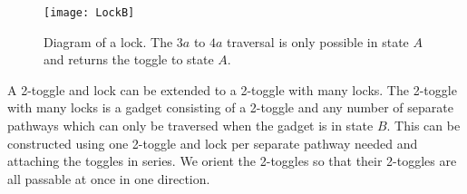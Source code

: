 \begin{wrapfigure}{tr}{0.45\textwidth}
\vspace{-5mm}
  \centering
    \texttt{[image: LockB]}
    \caption{Diagram of a lock. The $3a$ to $4a$ traversal is only possible in state $A$ and returns the toggle to state $A$.}
    \label{fig:LockA}
\vspace{-7mm}
\end{wrapfigure}

A 2-toggle and lock can be extended to a 2-toggle with many locks. The 2-toggle with many locks is a gadget consisting of a 2-toggle
and any number of separate pathways which can only be traversed when the gadget is in state $B$. This can be constructed using one 2-toggle and lock per separate pathway needed and attaching the toggles in series.
We orient the 2-toggles so that 
their 2-toggles are all passable at once in one direction.





